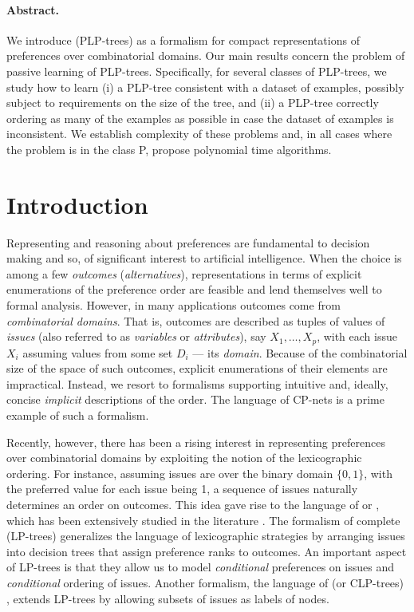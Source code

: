 \paragraph{\bf Abstract.}
We introduce  (PLP-trees) 
as a formalism for compact representations of preferences over 
combinatorial domains. Our main results concern the problem of passive 
learning of PLP-trees. Specifically, for several classes of 
PLP-trees, we study how to learn (i) a PLP-tree consistent with a 
dataset of examples, possibly subject to requirements on the size 
of the tree, and (ii) a PLP-tree correctly ordering as many of 
the examples as possible in case the dataset of examples is inconsistent. 
We establish complexity of these problems and, in all cases where the 
problem is in the class P, propose polynomial time algorithms.

\section{Introduction}
Representing and reasoning about preferences are fundamental to decision
making and so, of significant interest to artificial intelligence. When 
the choice is among a few \emph{outcomes} (\emph{alternatives}),
representations in terms of explicit enumerations of the preference order 
are feasible and lend themselves well to formal analysis. However, in many
applications outcomes come from \emph{combinatorial domains}. That is,
outcomes are described as tuples of values of \emph{issues} (also referred 
to as \emph{variables} or \emph{attributes}), say $X_1,\ldots, X_p$, with 
each issue $X_i$ assuming values from some set $D_i$ --- its \emph{domain}. 
Because of the combinatorial size of the space of such outcomes, explicit
enumerations of their elements are impractical. Instead, we resort to 
formalisms supporting intuitive and, ideally, concise \emph{implicit}
descriptions of the order. The language of CP-nets \cite{bbdh03} is a prime
example of such a formalism. 

Recently, however, there has been a rising interest in representing
preferences over combinatorial domains by exploiting the notion of
the lexicographic ordering. For instance, assuming issues are over the  
binary domain $\{0,1\}$, with the preferred value for each issue being 
1, a sequence of issues naturally determines an order on outcomes.
This idea gave rise to the language of  or , which has been extensively 
studied in the literature \cite{schmitt2006complexity,dombi2007learning,%
yaman2008democratic,Wilson14}. The formalism of complete  (LP-trees) \cite{booth:learningLP} generalizes the
language of lexicographic strategies by arranging issues into 
decision trees that assign preference ranks to outcomes. An important
aspect of LP-trees is that they allow us to model \emph{conditional}
preferences on issues and \emph{conditional} ordering of issues. 
Another formalism,
the language of  (or 
CLP-trees) \cite{brauning2012learning}, extends LP-trees by allowing 
subsets of issues as labels of nodes.

